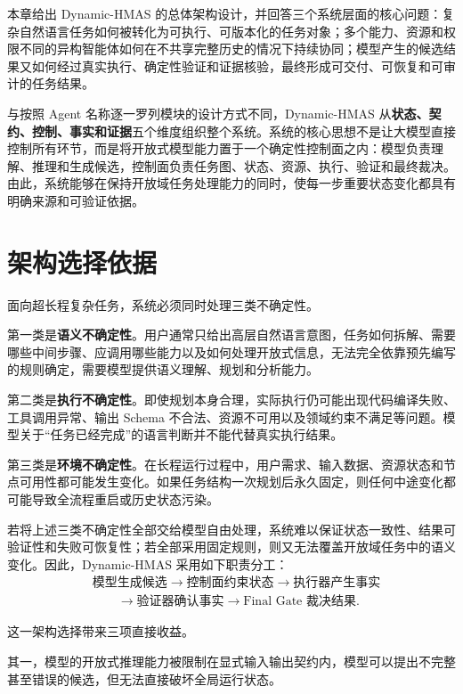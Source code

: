 \documentclass[UTF8,a4paper,12pt,oneside]{ctexbook}
\begin{document}
本章给出 Dynamic-HMAS 的总体架构设计，并回答三个系统层面的核心问题：复杂自然语言任务如何被转化为可执行、可版本化的任务对象；多个能力、资源和权限不同的异构智能体如何在不共享完整历史的情况下持续协同；模型产生的候选结果又如何经过真实执行、确定性验证和证据核验，最终形成可交付、可恢复和可审计的任务结果。

与按照 Agent 名称逐一罗列模块的设计方式不同，Dynamic-HMAS 从\textbf{状态、契约、控制、事实和证据}五个维度组织整个系统。系统的核心思想不是让大模型直接控制所有环节，而是将开放式模型能力置于一个确定性控制面之内：模型负责理解、推理和生成候选，控制面负责任务图、状态、资源、执行、验证和最终裁决。由此，系统能够在保持开放域任务处理能力的同时，使每一步重要状态变化都具有明确来源和可验证依据。


\section{架构选择依据}

面向超长程复杂任务，系统必须同时处理三类不确定性。

第一类是\textbf{语义不确定性}。用户通常只给出高层自然语言意图，任务如何拆解、需要哪些中间步骤、应调用哪些能力以及如何处理开放式信息，无法完全依靠预先编写的规则确定，需要模型提供语义理解、规划和分析能力。

第二类是\textbf{执行不确定性}。即使规划本身合理，实际执行仍可能出现代码编译失败、工具调用异常、输出 Schema 不合法、资源不可用以及领域约束不满足等问题。模型关于“任务已经完成”的语言判断并不能代替真实执行结果。

第三类是\textbf{环境不确定性}。在长程运行过程中，用户需求、输入数据、资源状态和节点可用性都可能发生变化。如果任务结构一次规划后永久固定，则任何中途变化都可能导致全流程重启或历史状态污染。

若将上述三类不确定性全部交给模型自由处理，系统难以保证状态一致性、结果可验证性和失败可恢复性；若全部采用固定规则，则又无法覆盖开放域任务中的语义变化。因此，Dynamic-HMAS 采用如下职责分工：
\[
\begin{aligned}
&\text{模型生成候选}
\rightarrow \text{控制面约束状态}
\rightarrow \text{执行器产生事实} \\[3pt]
&\qquad\rightarrow \text{验证器确认事实}
\rightarrow \text{Final Gate 裁决结果}.
\end{aligned}
\]

这一架构选择带来三项直接收益。

其一，模型的开放式推理能力被限制在显式输入输出契约内，模型可以提出不完整甚至错误的候选，但无法直接破坏全局运行状态。
\end{document}
